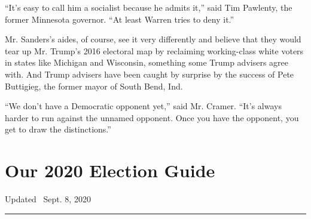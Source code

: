 ``It's easy to call him a socialist because he admits it,'' said Tim
Pawlenty, the former Minnesota governor. ``At least Warren tries to deny
it.''

Mr. Sanders's aides, of course, see it very differently and believe that
they would tear up Mr. Trump's 2016 electoral map by reclaiming
working-class white voters in states like Michigan and Wisconsin,
something some Trump advisers agree with. And Trump advisers have been
caught by surprise by the success of Pete Buttigieg, the former mayor of
South Bend, Ind.

``We don't have a Democratic opponent yet,'' said Mr. Cramer. ``It's
always harder to run against the unnamed opponent. Once you have the
opponent, you get to draw the distinctions.''

\hypertarget{our-2020-election-guide}{%
\section{Our 2020 Election Guide}\label{our-2020-election-guide}}

Updated ~Sept. 8, 2020

\begin{center}\rule{0.5\linewidth}{\linethickness}\end{center}

